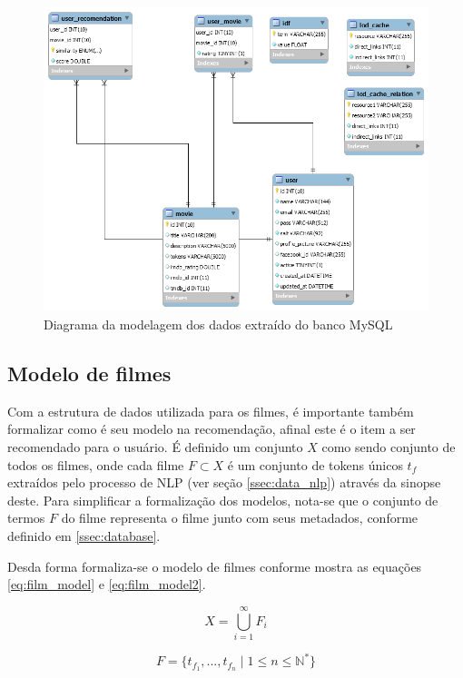 \begin{figure}
	\centering
	\includegraphics[scale=0.5]{imagens/user_model.png}
	\caption{Diagrama da modelagem dos dados extraído do banco MySQL}
	\label{fig:user_model}
\end{figure}

\label{ssec:database}
\subsection{Modelo de filmes}

Com a estrutura de dados utilizada para os filmes, é importante também formalizar como é seu modelo na recomendação, afinal este é o item a ser recomendado para o usuário. É definido um conjunto $X$ como sendo conjunto de todos os filmes, onde cada filme $F \subset X$ é um conjunto de tokens únicos $t_f$ extraídos pelo processo de \ac{NLP} (ver seção \ref{ssec:data_nlp}) através da sinopse deste. Para simplificar a formalização dos modelos, nota-se que o conjunto de termos $F$ do filme representa o filme junto com seus metadados, conforme definido em \ref{ssec:database}.

Desda forma formaliza-se o modelo de filmes conforme mostra as equações \ref{eq:film_model} e \ref{eq:film_model2}.

\begin{equation}
	X = \bigcup\limits_{i=1}^{\infty} F_{i}
\label{eq:film_model}
\end{equation}

\begin{equation}
	F = \{t_{f_1}, ..., t_{f_n} \; | \; 1 \leq n \leq \mathbb{N}^*\}
\label{eq:film_model2}
\end{equation}

